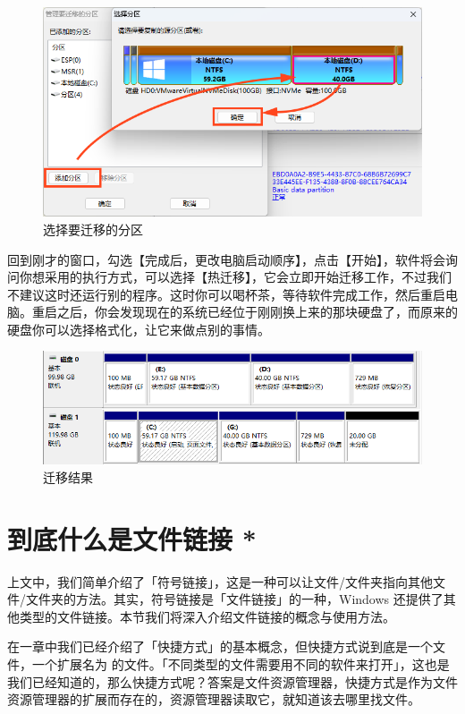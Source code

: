 {{{\begin{figure}[htb!]
  \centering
  \includegraphics[width=.6\textwidth]{assets/advanced/Select_Migrating_Partition.png}
  \caption{选择要迁移的分区}
  \label{fig:Select_Migrating_Partition}
\end{figure}

回到刚才的窗口，勾选【完成后，更改电脑启动顺序】，点击【开始】，软件将会询问你想采用的执行方式，可以选择【热迁移】，它会立即开始迁移工作，不过我们不建议这时还运行别的程序。这时你可以喝杯茶，等待软件完成工作，然后重启电脑。重启之后，你会发现现在的系统已经位于刚刚换上来的那块硬盘了，而原来的硬盘你可以选择格式化，让它来做点别的事情。

\begin{figure}[htb!]
  \centering
  \includegraphics[width=.75\textwidth]{assets/advanced/Migration_Result.png}
  \caption{迁移结果}
  \label{fig:Migration_Result}
\end{figure}

\section{到底什么是文件链接 *}

上文中，我们简单介绍了「符号链接」，这是一种可以让文件/文件夹指向其他文件/文件夹的方法。其实，符号链接是「文件链接」的一种，Windows 还提供了其他类型的文件链接。本节我们将深入介绍文件链接的概念与使用方法。

在一章中我们已经介绍了「快捷方式」的基本概念，但快捷方式说到底是一个文件，一个扩展名为  的文件。「不同类型的文件需要用不同的软件来打开」，这也是我们已经知道的，那么快捷方式呢？答案是文件资源管理器，快捷方式是作为文件资源管理器的扩展而存在的，资源管理器读取它，就知道该去哪里找文件。

}}}
